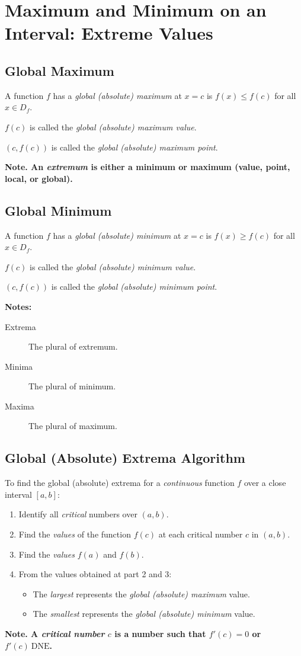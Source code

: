 \section{Maximum and Minimum on an Interval: Extreme Values}
\subsection{Global Maximum}
	A function $f$ has a \emph{global (absolute) maximum} at $x=c$ is $f(x) \leq f(c)$ for all $x \in D_f$.

	$f(c)$ is called the \emph{global (absolute) maximum value}.

	$(c, f(c))$ is called the \emph{global (absolute) maximum point}.

	\textbf{Note. An \emph{extremum} is either a minimum or maximum (value, point, local, or global).}
\subsection{Global Minimum}
	A function $f$ has a \emph{global (absolute) minimum} at $x = c$ is $f(x) \geq f(c)$ for all $x \in D_f$.

	$f(c)$ is called the \emph{global (absolute) minimum value}.

	$(c, f(c))$ is called the \emph{global (absolute) minimum point}.

	\textbf{Notes:}
	\begin{description}
		\item[Extrema] The plural of extremum.
		\item[Minima] The plural of minimum.
		\item[Maxima] The plural of maximum.
	\end{description}
\subsection{Global (Absolute) Extrema Algorithm}
	To find the global (absolute) extrema for a \emph{continuous} function $f$ over a close interval $[a,b]$:
	\begin{enumerate}
		\item Identify all \emph{critical} numbers over $(a,b)$.
		\item Find the \emph{values} of the function $f(c)$ at each critical number $c$ in $(a,b)$.
		\item Find the \emph{values} $f(a)$ and $f(b)$.
		\item From the values obtained at part 2 and 3:
			\begin{itemize}
				\item The \emph{largest} represents the \emph{global (absolute) maximum} value.
				\item The \emph{smallest} represents the \emph{global (absolute) minimum} value.
			\end{itemize}
	\end{enumerate}
	\textbf{Note. A \emph{critical number} $c$ is a number such that $f'(c) = 0$ or $f'(c)\ \mathrm{DNE}$.}
